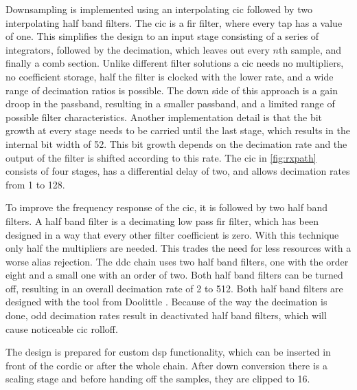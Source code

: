 \documentclass[12pt,a4paper,parskip=full,abstracton]{scrartcl}
\begin{document}
Downsampling is implemented using an interpolating \gls{cic} followed by two
interpolating half band filters. The \gls{cic} is a \gls{fir} filter, where every tap has
a value of one. This simplifies the design to an input stage consisting
of a series of integrators, followed by the decimation, which leaves out every
$n$th sample, and finally a comb section. Unlike different filter solutions
a \gls{cic} needs no multipliers, no coefficient storage, half the filter is
clocked with the lower rate, and a wide range of decimation ratios is possible. The down
side of this approach is a gain droop in the passband, resulting in a smaller
passband, and a limited range of possible filter characteristics\cite{hog81}.
Another implementation detail is that the bit growth at every stage needs to
be carried until the last stage, which results in the internal bit width of
\SI{52}{\bit}. This bit growth depends on the decimation rate\cite{hog81} and
the output of the filter is shifted according to this rate. The \gls{cic} in
\cref{fig:rxpath} consists of four stages, has a differential delay
of two, and allows decimation rates from 1 to 128.

To improve the frequency response of the \gls{cic}, it is followed by two half band
filters. A half band filter is a decimating low pass \gls{fir} filter, which has
been designed in a way that every other filter coefficient is zero. With this technique
only half the multipliers are needed. This trades the need for less resources with
a worse alias rejection. The \gls{ddc} chain uses two half band filters,
one with the order eight and a small one with an order of two. Both half band filters can be
turned off, resulting in an overall decimation rate of 2 to 512. Both half band
filters are designed with the tool from Doolittle \cite{halfband}. Because of
the way the decimation is done, odd decimation rates result in deactivated half band
filters, which will cause noticeable \gls{cic} rolloff.

The design is prepared for custom \gls{dsp} functionality, which can be inserted in front
of the cordic or after the whole chain. After down conversion there is a scaling stage and
before handing off the samples, they are clipped to \SI{16}{\bit}.
\end{document}
